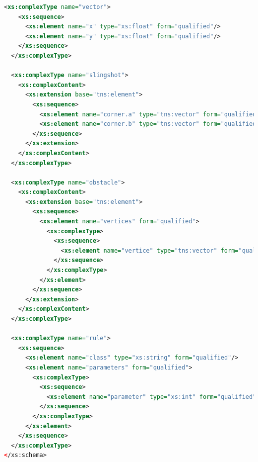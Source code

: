 \documentclass[fontsize=12pt,
               paper=a4,
               twoside=false,
               parskip=half,
               ]{scrartcl}
\begin{document}
\begin{lstlisting}[language=xml,label=lst:default_playfield,caption={schema for playfields.xml}]
  <xs:complexType name="vector">
    <xs:sequence>
      <xs:element name="x" type="xs:float" form="qualified"/>
      <xs:element name="y" type="xs:float" form="qualified"/>
    </xs:sequence>
  </xs:complexType>

  <xs:complexType name="slingshot">
    <xs:complexContent>
      <xs:extension base="tns:element">
        <xs:sequence>
          <xs:element name="corner.a" type="tns:vector" form="qualified"/>
          <xs:element name="corner.b" type="tns:vector" form="qualified"/>
        </xs:sequence>
      </xs:extension>
    </xs:complexContent>
  </xs:complexType>

  <xs:complexType name="obstacle">
    <xs:complexContent>
      <xs:extension base="tns:element">
        <xs:sequence>
          <xs:element name="vertices" form="qualified">
            <xs:complexType>
              <xs:sequence>
                <xs:element name="vertice" type="tns:vector" form="qualified" maxOccurs="unbounded"/>
              </xs:sequence>
            </xs:complexType>
          </xs:element>
        </xs:sequence>
      </xs:extension>
    </xs:complexContent>
  </xs:complexType>

  <xs:complexType name="rule">
    <xs:sequence>
      <xs:element name="class" type="xs:string" form="qualified"/>
      <xs:element name="parameters" form="qualified">
        <xs:complexType>
          <xs:sequence>
            <xs:element name="parameter" type="xs:int" form="qualified" maxOccurs="unbounded"/>
          </xs:sequence>
        </xs:complexType>
      </xs:element>
    </xs:sequence>
  </xs:complexType>
</xs:schema>
\end{lstlisting}
\end{document}
